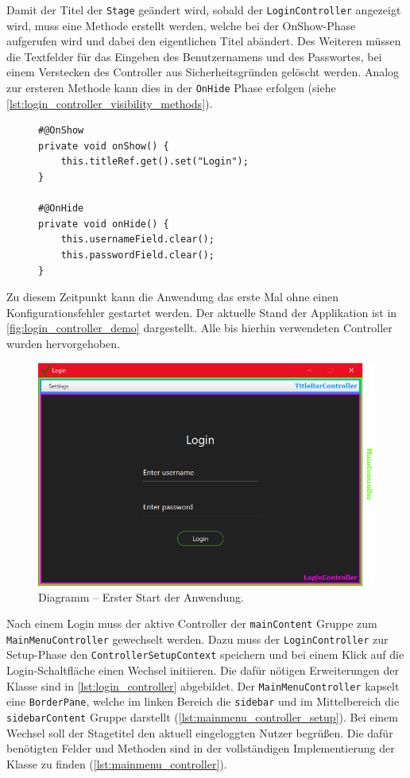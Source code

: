 \noindent Damit der Titel der \texttt{Stage} geändert wird, sobald der \texttt{LoginController} angezeigt wird, muss eine Methode erstellt werden, welche bei der OnShow-Phase aufgerufen wird und dabei den eigentlichen Titel abändert. Des Weiteren müssen die Textfelder für das Eingeben des Benutzernamens und des Passwortes, bei einem Verstecken des Controller aus Sicherheitsgründen gelöscht werden. Analog zur ersteren Methode kann dies in der \texttt{OnHide} Phase erfolgen (siehe \autoref{lst:login_controller_visibility_methods}).
\begin{figure}[H]
	\begin{lstlisting}[caption=Demo -- OnShow und OnHide Methoden., captionpos=b, label=lst:login_controller_visibility_methods]
#@OnShow
private void onShow() {
    this.titleRef.get().set("Login");
}

#@OnHide
private void onHide() {
    this.usernameField.clear();
    this.passwordField.clear();
}
	\end{lstlisting}
\end{figure}
\noindent Zu diesem Zeitpunkt kann die Anwendung das erste Mal ohne einen Konfigurationsfehler gestartet werden. Der aktuelle Stand der Applikation ist in \autoref{fig:login_controller_demo} dargestellt. Alle bis hierhin verwendeten Controller wurden hervorgehoben.
\begin{figure}[H]
	\centering
	\includegraphics[width=\textwidth]{Abbildungen/Login Screen.png}
	\caption{Diagramm -- Erster Start der Anwendung.}
	\label{fig:login_controller_demo}
\end{figure}
\noindent Nach einem Login muss der aktive Controller der \texttt{mainContent} Gruppe zum \texttt{MainMenuController} gewechselt werden. Dazu muss der \texttt{LoginController} zur Setup-Phase den \texttt{ControllerSetupContext} speichern und bei einem Klick auf die Login-Schaltfläche einen Wechsel initiieren. Die dafür nötigen Erweiterungen der Klasse sind in \autoref{lst:login_controller} abgebildet. Der \texttt{MainMenuController} kapselt eine \texttt{BorderPane}, welche im linken Bereich die \texttt{sidebar} und im Mittelbereich die \texttt{sidebarContent} Gruppe darstellt (\autoref{lst:mainmenu_controller_setup}). Bei einem Wechsel soll der Stagetitel den aktuell eingeloggten Nutzer begrüßen. Die dafür benötigten Felder und Methoden sind in der vollständigen Implementierung der Klasse zu finden (\autoref{lst:mainmenu_controller}).
